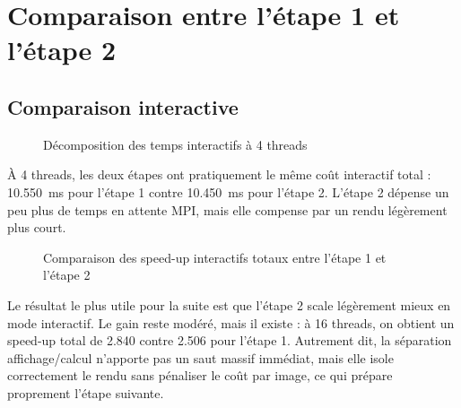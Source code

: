 \section{Comparaison entre l'étape 1 et l'étape 2}

\subsection{Comparaison interactive}

\begin{figure}[H]
    \centering
    
    \caption{Décomposition des temps interactifs à 4 threads}
    \label{fig:stage1_stage2_interactive_breakdown}
\end{figure}

À 4 threads, les deux étapes ont pratiquement le même coût interactif total : \SI{10.550}{ms} pour l'étape 1 contre \SI{10.450}{ms} pour l'étape 2. L'étape 2 dépense un peu plus de temps en attente MPI, mais elle compense par un rendu légèrement plus court.

\begin{figure}[H]
    \centering
    
    \caption{Comparaison des speed-up interactifs totaux entre l'étape 1 et l'étape 2}
    \label{fig:stage1_stage2_interactive_speedup}
\end{figure}

Le résultat le plus utile pour la suite est que l'étape 2 scale légèrement mieux en mode interactif. Le gain reste modéré, mais il existe : à 16 threads, on obtient un speed-up total de 2.840 contre 2.506 pour l'étape 1. Autrement dit, la séparation affichage/calcul n'apporte pas un saut massif immédiat, mais elle isole correctement le rendu sans pénaliser le coût par image, ce qui prépare proprement l'étape suivante.
